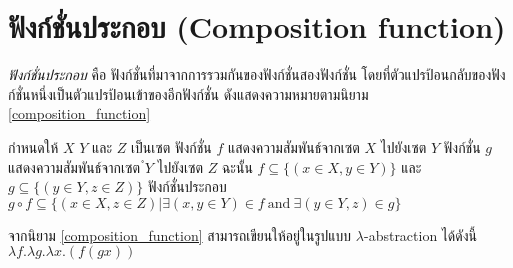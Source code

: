 \section{ฟังก์ชั่นประกอบ (Composition function)}
\par{
\textit{ฟังก์ชั่นประกอบ} คือ ฟังก์ชั่นที่มาจากการรวมกันของฟังก์ชั่นสองฟังก์ชั่น 
โดยที่ตัวแปรป้อนกลับของฟังก์ชั่นหนึ่งเป็นตัวแปรป้อนเข้าของอีกฟังก์ชั่น 
ดังแสดงความหมายตามนิยาม \ref{composition_function}
%
\begin{defn}
\label{composition_function}
กำหนดให้ $X$ $Y$ และ $Z$ เป็นเซต 
ฟังก์ชั่น $f$ แสดงความสัมพันธ์จากเซต $X$ ไปยังเซต $Y$ 
ฟังก์ชั่น $g$ แสดงความสัมพันธ์จากเซต $ํY$ ไปยังเซต $Z$ 
ฉะนั้น $f \subseteq \{(x \in X, y \in Y)\}$
และ $g \subseteq \{(y \in Y, z \in Z)\}$
ฟังก์ชั่นประกอบ 
$g \circ f \subseteq \{(x \in X, z \in Z) | \exists (x,y \in Y) \in f ~\mbox{and}~ \exists(y \in Y,z) \in g \}$
\end{defn}
}

\par{
จากนิยาม \ref{composition_function}
สามารถเขียนให้อยู่ในรูปแบบ $\lambda$-abstraction ได้ดังนี้
$\lambda f.\lambda g. \lambda x.(f(g x))$
}

